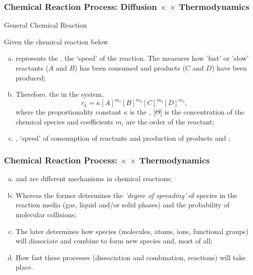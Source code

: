 \documentclass[10pt,compress,unknownkeysallowed]{beamer}
\begin{document}
\begin{frame}
  \frametitle{Chemical Reaction Process: Diffusion $\times$  $\times$ Thermodynamics}

  \begin{block}{\begin{center}General Chemical Reaction\end{center}}
     Given the chemical reaction below
  \end{block}  

   \begin{enumerate}[a)]
       \item<1->  represents the , \ie the `speed' of the reaction. The  measures how 'fast' or 'slow' reactants ($A$ and $B$) has been consumed and products ($C$ and $D$) have been produced;
       \item<1-> Therefore, the  in the system, \eg
             \begin{displaymath}
                  r_{k} = \kappa [A]^{m_{1}}[B]^{m_{2}}[C]^{m_{3}}[D]^{m_{4}},
             \end{displaymath}
             where the proportionality constant $\kappa$ is the , [$\Theta$] is the concentration of the chemical species and coefficients $m_{i}$ are the order of the reactant;
       \item<1-> , \ie `speed' of consumption of reactants and production of products and ;
   \end{enumerate}
\end{frame}
\normalsize

\begin{frame}
  \frametitle{Chemical Reaction Process:  $\times$  $\times$ Thermodynamics}


   \begin{enumerate}[a)]
       \item<1->  and  are different mechanisms in chemical reactions;
       \item<2-> Whereas the former determines the {\it 'degree of spreading'} of species in the reaction media (\ie gas, liquid and/or solid phases) and the probability of molecular collisions;
       \item<3-> The later determines how species (\ie molecules, atoms, ions, functional groups) will dissociate and combine to form new species and, most of all;
        \item<4-> How fast these processes (dissociation and combination, \ie reactions) will take place.
   \end{enumerate}
\end{frame}
\normalsize
\end{document}
